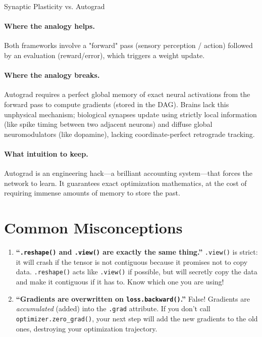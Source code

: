 \begin{analogybox}{Synaptic Plasticity vs. Autograd}
  \paragraph{Where the analogy helps.}
  Both frameworks involve a "forward" pass (sensory perception / action) followed by an evaluation (reward/error), which triggers a weight update. 

  \paragraph{Where the analogy breaks.}
  Autograd requires a perfect global memory of exact neural activations from the forward pass to compute gradients (stored in the DAG). Brains lack this unphysical mechanism; biological synapses update using strictly local information (like spike timing between two adjacent neurons) and diffuse global neuromodulators (like dopamine), lacking coordinate-perfect retrograde tracking.

  \paragraph{What intuition to keep.}
  Autograd is an engineering hack—a brilliant accounting system—that forces the network to learn. It guarantees exact optimization mathematics, at the cost of requiring immense amounts of memory to store the past.
\end{analogybox}

\section{Common Misconceptions}
\label{ch:03:sec:misconceptions}

\begin{enumerate}
  \item \textbf{``\texttt{.reshape()} and \texttt{.view()} are exactly the same thing.''} \texttt{.view()} is strict: it will crash if the tensor is not contiguous because it promises not to copy data. \texttt{.reshape()} acts like \texttt{.view()} if possible, but will secretly copy the data and make it contiguous if it has to. Know which one you are using!
  \item \textbf{``Gradients are overwritten on \texttt{loss.backward()}.''} False! Gradients are \emph{accumulated} (added) into the \texttt{.grad} attribute. If you don't call \texttt{optimizer.zero\_grad()}, your next step will add the new gradients to the old ones, destroying your optimization trajectory.
\end{enumerate}


